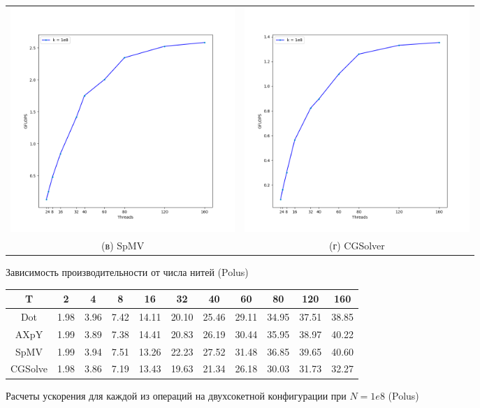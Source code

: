 \documentclass[12pt, a4paper]{article}
\begin{document}
\begin{figure}[H]
\begin{tabular}{cc}
		\includegraphics[width=85mm]{multithread_polus_spmv2} & \includegraphics[width=85mm]{multithread_polus_cgsolver2} \\
		(в) SpMV & (г) CGSolver \\[6pt]
	\end{tabular}
	\caption{Зависимость производительности от числа нитей (Polus)}
	\label{fig:multithread_flops_polus2} 
\end{figure}

\begin{figure}[H]
	\center
	\setlength{\tabcolsep}{10pt}
	\renewcommand{\arraystretch}{1.5}
	\begin{tabular}{|c|c|c|c|c|c|c|c|c|c|c|}
		\hline
		T & 2 & 4 & 8 & 16 & 32 & 40 & 60 & 80 & 120 & 160  \\
		\hline
		Dot & 1.98 & 3.96 & 7.42 & 14.11 & 20.10 & 25.46 & 29.11 & 34.95 & 37.51 & 38.85 \\
		\hline
		AXpY & 1.99 & 3.89 & 7.38 & 14.41 & 20.83 & 26.19 & 30.44 & 35.95 & 38.97 & 40.22  \\
		\hline
		SpMV & 1.99 & 3.94 & 7.51 & 13.26 & 22.23 & 27.52 & 31.48 & 36.85 & 39.65 & 40.60  \\
		\hline
		CGSolve & 1.98 & 3.86 & 7.19 & 13.43 & 19.63 & 21.34 & 26.18 & 30.03 & 31.73 & 32.27 \\
		\hline
	\end{tabular}
	\caption{Расчеты ускорения для каждой из операций на двухсокетной конфигурации при $N = 1e8$ (Polus)}
	\label{fig:speedup2}
\end{figure}
\end{document}
